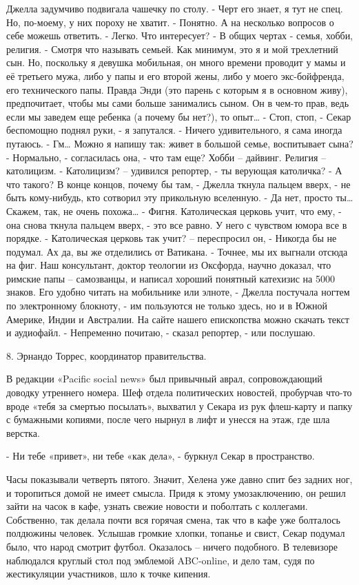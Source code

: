 \documentclass{book}
\begin{document}
Джелла задумчиво подвигала чашечку по столу.
- Черт его знает, я тут не спец. Но, по-моему, у них пороху не хватит.
- Понятно. А на несколько вопросов о себе можешь ответить.
- Легко. Что интересует?
- В общих чертах - семья, хобби, религия.
- Смотря что называть семьей. Как минимум, это я и мой трехлетний сын. Но, поскольку я девушка мобильная, он много времени проводит у мамы и её третьего мужа, либо у папы и его второй жены, либо у моего экс-бойфренда, его технического папы. Правда Энди (это парень с которым я в основном живу), предпочитает, чтобы мы сами больше занимались сыном. Он в чем-то прав, ведь если мы заведем еще ребенка (а почему бы нет?), то опыт\ldots{}
- Стоп, стоп, - Секар беспомощно поднял руки, - я запутался.
- Ничего удивительного, я сама иногда путаюсь.
- Гм\ldots{} Можно я напишу так: живет в большой семье, воспитывает сына?
- Нормально, - согласилась она, - что там еще? Хобби -- дайвинг. Религия -- католицизм.
- Католицизм? -- удивился репортер, - ты верующая католичка?
- А что такого? В конце концов, почему бы там, - Джелла ткнула пальцем вверх, - не быть кому-нибудь, кто сотворил эту прикольную вселенную.
- Да нет, просто ты\ldots{} Скажем, так, не очень похожа\ldots{}
- Фигня. Католическая церковь учит, что ему, - она снова ткнула пальцем вверх, - это все равно. У него с чувством юмора все в порядке.
- Католическая церковь так учит? -- переспросил он, - Никогда бы не подумал. Ах да, вы же отделились от Ватикана.
- Точнее, мы их выгнали отсюда на фиг. Наш консультант, доктор теологии из Оксфорда, научно доказал, что римские папы -- самозванцы, и написал хороший понятный катехизис на 5000 знаков. Его удобно читать на мобильнике или элноте, - Джелла постучала ногтем по электронному блокноту, - им пользуются не только здесь, но и в Южной Америке, Индии и Австралии. На сайте нашего епископства можно скачать текст и аудиофайл.
- Непременно почитаю, - сказал репортер, - или послушаю.



8. Эрнандо Торрес, координатор правительства.


В редакции «Pacific social news» был привычный аврал, сопровождающий доводку утреннего номера. Шеф отдела политических новостей, пробурчав что-то вроде «тебя за смертью посылать», выхватил у Секара из рук флеш-карту и папку с бумажными копиями, после чего нырнул в лифт и унесся на этаж, где шла верстка.

- Ни тебе «привет», ни тебе «как дела», - буркнул Секар в пространство.

Часы показывали четверть пятого. Значит, Хелена уже давно спит без задних ног, и торопиться домой не имеет смысла. Придя к этому умозаключению, он решил зайти на часок в кафе, узнать свежие новости и поболтать с коллегами. Собственно, так делала почти вся горячая смена, так что в кафе уже болталось полдюжины человек. Услышав громкие хлопки, топанье и свист, Секар подумал было, что народ смотрит футбол. Оказалось -- ничего подобного. В телевизоре наблюдался круглый стол под эмблемой ABC-online, и дело там, судя по жестикуляции участников, шло к точке кипения.
\end{document}
